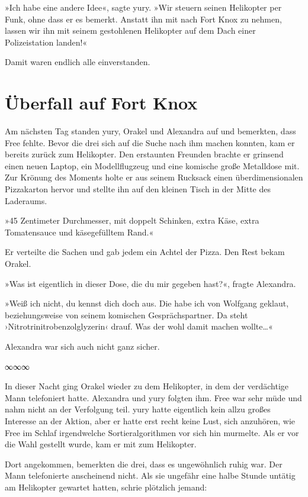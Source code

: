 »Ich habe eine andere Idee«, sagte yury. »Wir steuern seinen Helikopter per Funk, ohne dass er es bemerkt. Anstatt ihn mit nach Fort Knox zu nehmen, lassen wir ihn mit seinem gestohlenen Helikopter auf dem Dach einer Polizeistation landen!«

Damit waren endlich alle einverstanden.


\chapter{Überfall auf Fort Knox}

Am nächsten Tag standen yury, Orakel und Alexandra auf und bemerkten, dass Free fehlte. Bevor die drei sich auf die Suche nach ihm machen konnten, kam er bereits zurück zum Helikopter. Den erstaunten Freunden brachte er grinsend einen neuen Laptop, ein Modellflugzeug und eine komische große Metalldose mit. Zur Krönung des Moments holte er aus seinem Rucksack einen überdimensionalen Pizzakarton hervor und stellte ihn auf den kleinen Tisch in der Mitte des Laderaums.

»45 Zentimeter Durchmesser, mit doppelt Schinken, extra Käse, extra Tomatensauce und käsegefülltem Rand.«

Er verteilte die Sachen und gab jedem ein Achtel der Pizza. Den Rest bekam Orakel.

»Was ist eigentlich in dieser Dose, die du mir gegeben hast?«, fragte Alexandra.

»Weiß ich nicht, du kennst dich doch aus. Die habe ich von Wolfgang geklaut, beziehungsweise von seinem komischen Gesprächspartner. Da steht ›Nitrotrinitrobenzolglyzerin‹ drauf. Was der wohl damit machen wollte…«

Alexandra war sich auch nicht ganz sicher.

\begin{center}
    ∞∞∞
\end{center}

In dieser Nacht ging Orakel wieder zu dem Helikopter, in dem der verdächtige Mann telefoniert hatte. Alexandra und yury folgten ihm. Free war sehr müde und nahm nicht an der Verfolgung teil. yury hatte eigentlich kein allzu großes Interesse an der Aktion, aber er hatte erst recht keine Lust, sich anzuhören, wie Free im Schlaf irgendwelche Sortieralgorithmen vor sich hin murmelte. Als er vor die Wahl gestellt wurde, kam er mit zum Helikopter.

Dort angekommen, bemerkten die drei, dass es ungewöhnlich ruhig war. Der Mann telefonierte anscheinend nicht. Als sie ungefähr eine halbe Stunde untätig am Helikopter gewartet hatten, schrie plötzlich jemand:

